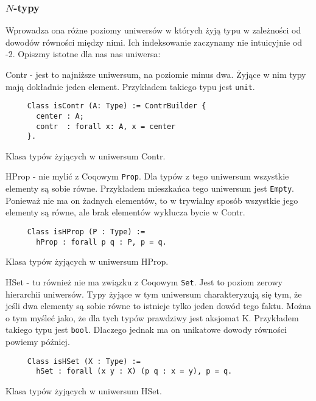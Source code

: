 \subsubsection{$N$-typy}
Wprowadza ona różne poziomy uniwersów w których żyją typu w zależności od dowodów równości między nimi. Ich indeksowanie zaczynamy nie intuicyjnie od -2. Opiszmy istotne dla nas nas uniwersa:
\begin{description}
    \item{Contr} - jest to najniższe uniwersum, na poziomie minus dwa. Żyjące w nim typy mają dokładnie jeden element. Przykładem takiego typu jest \texttt{unit}.
    \begin{code}
    \begin{verbatim}
     Class isContr (A: Type) := ContrBuilder {
       center : A;
       contr  : forall x: A, x = center
     }.
    \end{verbatim}
    \caption{Klasa typów żyjących w uniwersum Contr.}
    \label{isContr}
    \end{code}
    \item{HProp} - nie mylić z Coqowym \texttt{Prop}. Dla typów z tego uniwersum wszystkie elementy są sobie równe. Przykładem mieszkańca tego uniwersum jest \texttt{Empty}. Ponieważ nie ma on żadnych elementów, to w trywialny sposób wszystkie jego elementy są równe, ale brak elementów wyklucza bycie w Contr.
    \begin{code}
    \begin{verbatim}
     Class isHProp (P : Type) :=
       hProp : forall p q : P, p = q.
    \end{verbatim}
    \caption{Klasa typów żyjących w uniwersum HProp.}
    \label{isHProp}
    \end{code}
    \item{HSet} - tu również nie ma związku z Coqowym \texttt{Set}. Jest to poziom zerowy hierarchii uniwersów. Typy żyjące w tym uniwersum charakteryzują się tym, że jeśli dwa elementy są sobie równe to istnieje tylko jeden dowód tego faktu. Można o tym myśleć jako, że dla tych typów prawdziwy jest aksjomat K. Przykładem takiego typu jest \texttt{bool}. Dlaczego jednak ma on unikatowe dowody równości powiemy później. 
    \begin{code}
    \begin{verbatim}
     Class isHSet (X : Type) :=
       hSet : forall (x y : X) (p q : x = y), p = q.
    \end{verbatim}
    \caption{Klasa typów żyjących w uniwersum HSet.}
    \label{isHProp}
    \end{code}
\end{description}
